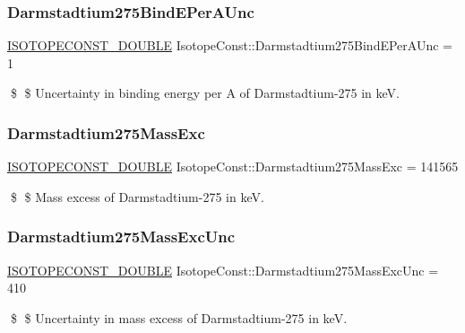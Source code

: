 \subsubsection{\texorpdfstring{Darmstadtium275\+Bind\+E\+Per\+A\+Unc}{Darmstadtium275BindEPerAUnc}}
{\footnotesize\ttfamily \mbox{\hyperlink{group___isotope_const-_macros_ga8f45a7272ce02c0b4c65c44636ed719a}{I\+S\+O\+T\+O\+P\+E\+C\+O\+N\+S\+T\+\_\+\+D\+O\+U\+B\+LE}} Isotope\+Const\+::\+Darmstadtium275\+Bind\+E\+Per\+A\+Unc = 1}

\$ \$ Uncertainty in binding energy per A of Darmstadtium-\/275 in keV. \mbox{\label{group___isotope_const-_darmstadtium-_ds275_gafebb6562008ba5a830bb3ce60a0ee87c}} 
\subsubsection{\texorpdfstring{Darmstadtium275\+Mass\+Exc}{Darmstadtium275MassExc}}
{\footnotesize\ttfamily \mbox{\hyperlink{group___isotope_const-_macros_ga8f45a7272ce02c0b4c65c44636ed719a}{I\+S\+O\+T\+O\+P\+E\+C\+O\+N\+S\+T\+\_\+\+D\+O\+U\+B\+LE}} Isotope\+Const\+::\+Darmstadtium275\+Mass\+Exc = 141565}

\$ \$ Mass excess of Darmstadtium-\/275 in keV. \mbox{\label{group___isotope_const-_darmstadtium-_ds275_gaecd1ccb4c1d77c364644e6a6cd4083e6}} 
\subsubsection{\texorpdfstring{Darmstadtium275\+Mass\+Exc\+Unc}{Darmstadtium275MassExcUnc}}
{\footnotesize\ttfamily \mbox{\hyperlink{group___isotope_const-_macros_ga8f45a7272ce02c0b4c65c44636ed719a}{I\+S\+O\+T\+O\+P\+E\+C\+O\+N\+S\+T\+\_\+\+D\+O\+U\+B\+LE}} Isotope\+Const\+::\+Darmstadtium275\+Mass\+Exc\+Unc = 410}

\$ \$ Uncertainty in mass excess of Darmstadtium-\/275 in keV. \mbox{\label{group___isotope_const-_darmstadtium-_ds275_gaeec3f68716923954637df00cdc3baf2b}} 
